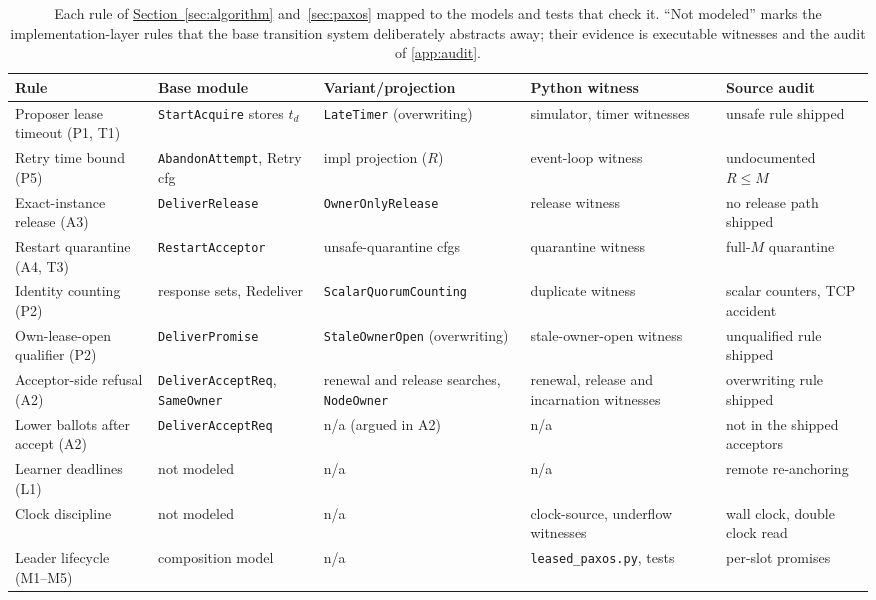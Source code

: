 \documentclass[final,5p,times,twocolumn,number]{elsarticle}
\newcommand{\code}[1]{\texttt{#1}}
\newcommand{\secref}[1]{\hyperref[#1]{Section~\ref*{#1}}}
\begin{document}
\begin{table}[!t]
\centering
\scriptsize
\setlength{\tabcolsep}{3pt}
\renewcommand{\arraystretch}{1.0}
\begin{tabularx}{\textwidth}{l>{\raggedright\arraybackslash}X>{\raggedright\arraybackslash}X>{\raggedright\arraybackslash}X>{\raggedright\arraybackslash}X}
\toprule
\textbf{Rule} & \textbf{Base module} & \textbf{Variant/projection} & \textbf{Python witness} & \textbf{Source audit} \\
\midrule[\heavyrulewidth]
Proposer lease timeout (P1, T1) & \code{StartAcquire} stores $t_d$ & \code{LateTimer} (overwriting) & simulator, timer witnesses & unsafe rule shipped \\
Retry time bound (P5) & \code{AbandonAttempt}, Retry cfg & impl projection ($R$) & event-loop witness & undocumented $R \leq M$ \\
Exact-instance release (A3) & \code{DeliverRelease} & \code{OwnerOnlyRelease} & release witness & no release path shipped \\
Restart quarantine (A4, T3) & \code{RestartAcceptor} & unsafe-quarantine cfgs & quarantine witness & full-$M$ quarantine \\
Identity counting (P2) & response sets, Redeliver & \code{ScalarQuorumCounting} & duplicate witness & scalar counters, TCP accident \\
Own-lease-open qualifier (P2) & \code{DeliverPromise} & \code{StaleOwnerOpen} (overwriting) & stale-owner-open witness & unqualified rule shipped \\
Acceptor-side refusal (A2) & \code{DeliverAcceptReq}, \code{SameOwner} & renewal and release searches, \code{NodeOwner} & renewal, release and incarnation witnesses & overwriting rule shipped \\
Lower ballots after accept (A2) & \code{DeliverAcceptReq} & n/a (argued in A2) & n/a & not in the shipped acceptors \\
Learner deadlines (L1) & not modeled & n/a & n/a & remote re-anchoring \\
Clock discipline & not modeled & n/a & clock-source, underflow witnesses & wall clock, double clock read \\
Leader lifecycle (M1--M5) & composition model & n/a & \code{leased\_paxos.py}, tests & per-slot promises \\
\bottomrule
\end{tabularx}
\caption{\label{tab:evidence}Each rule of \secref{sec:algorithm} and~\ref{sec:paxos} mapped to the models and tests that check it.  ``Not modeled'' marks the implementation-layer rules that the base transition system deliberately abstracts away; their evidence is executable witnesses and the audit of \ref{app:audit}.}
\end{table}
\end{document}

